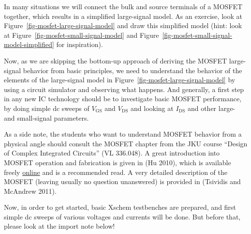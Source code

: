 \documentclass[
  a4paper,
  DIV=11,
  numbers=noendperiod]{scrartcl}
\begin{document}
\begin{tcolorbox}[enhanced jigsaw, titlerule=0mm, left=2mm, coltitle=black, toprule=.15mm, breakable, opacitybacktitle=0.6, colframe=quarto-callout-note-color-frame, bottomtitle=1mm, toptitle=1mm, opacityback=0, colbacktitle=quarto-callout-note-color!10!white, title=\textcolor{quarto-callout-note-color}{\faInfo}\hspace{0.5em}{MOSFET Bulk Terminal}, arc=.35mm, rightrule=.15mm, colback=white, bottomrule=.15mm, leftrule=.75mm]

In many situations we will connect the bulk and source terminals of a
MOSFET together, which results in a simplified large-signal model. As an
exercise, look at Figure~\ref{fig-mosfet-large-signal-model} and draw
this simplified model (hint: look at
Figure~\ref{fig-mosfet-small-signal-model} and
Figure~\ref{fig-mosfet-small-signal-model-simplified} for inspiration).

\end{tcolorbox}

Now, as we are skipping the bottom-up approach of deriving the MOSFET
large-signal behavior from basic principles, we need to understand the
behavior of the elements of the large-signal model in
Figure~\ref{fig-mosfet-large-signal-model} by using a circuit simulator
and observing what happens. And generally, a first step in any new IC
technology should be to investigate basic MOSFET performance, by doing
simple dc sweeps of \(V_\mathrm{GS}\) and \(V_\mathrm{DS}\) and looking
at \(I_\mathrm{DS}\) and other large- and small-signal parameters.

As a side note, the students who want to understand MOSFET behavior from
a physical angle should consult the MOSFET chapter from the JKU course
``Design of Complex Integrated Circuits'' (VL 336.048). A great
introduction into MOSFET operation and fabrication is given in (Hu
2010), which is available freely
\href{https://www.chu.berkeley.edu/modern-semiconductor-devices-for-integrated-circuits-chenming-calvin-hu-2010/}{online}
and is a recommended read. A very detailed description of the MOSFET
(leaving usually no question unanswered) is provided in (Tsividis and
McAndrew 2011).

Now, in order to get started, basic Xschem testbenches are prepared, and
first simple dc sweeps of various voltages and currents will be done.
But before that, please look at the import note below!
\end{document}
